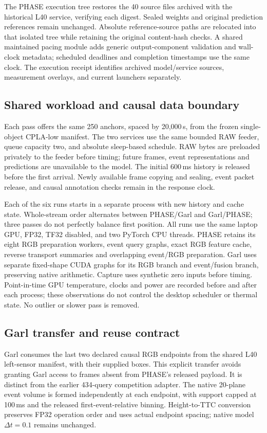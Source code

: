 The PHASE execution tree restores the 40 source files archived with the historical L40 service, verifying each digest. Sealed weights and original prediction references remain unchanged. Absolute reference-source paths are relocated into that isolated tree while retaining the original content-hash checks. A shared maintained pacing module adds generic output-component validation and wall-clock metadata; scheduled deadlines and completion timestamps use the same clock. The execution receipt identifies archived model/service sources, measurement overlays, and current launchers separately.

\subsection{Shared workload and causal data boundary}

Each pass offers the same 250 anchors, spaced by 20,000\,\textmu s, from the frozen single-object CPLA-low manifest. The two services use the same bounded RAW feeder, queue capacity two, and absolute sleep-based schedule. RAW bytes are preloaded privately to the feeder before timing; future frames, event representations and predictions are unavailable to the model. The initial 600\,ms history is released before the first arrival. Newly available frame copying and sealing, event packet release, and causal annotation checks remain in the response clock.

Each of the six runs starts in a separate process with new history and cache state. Whole-stream order alternates between PHASE/Garl and Garl/PHASE; three passes do not perfectly balance first position. All runs use the same laptop GPU, FP32, TF32 disabled, and two PyTorch CPU threads. PHASE retains its eight RGB preparation workers, event query graphs, exact RGB feature cache, reverse transport summaries and overlapping event/RGB preparation. Garl uses separate fixed-shape CUDA graphs for its RGB branch and event/fusion branch, preserving native arithmetic. Capture uses synthetic zero inputs before timing. Point-in-time GPU temperature, clocks and power are recorded before and after each process; these observations do not control the desktop scheduler or thermal state. No outlier or slower pass is removed.

\subsection{Garl transfer and reuse contract}

Garl consumes the last two declared causal RGB endpoints from the shared L40 left-sensor manifest, with their supplied boxes. This explicit transfer avoids granting Garl access to frames absent from PHASE's released payload. It is distinct from the earlier 434-query competition adapter. The native 20-plane event volume is formed independently at each endpoint, with support capped at 100\,ms and the released first-event-relative binning. Height-to-TTC conversion preserves FP32 operation order and uses actual endpoint spacing; native model $\Delta t=0.1$ remains unchanged.

